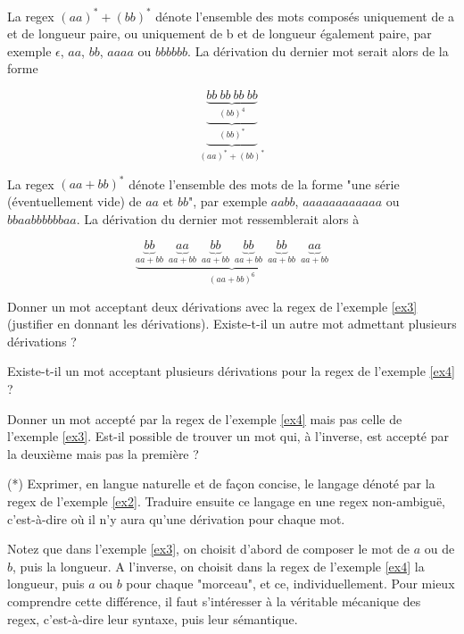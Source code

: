 \begin{example}
\label{ex3}
La regex $(aa)^*+(bb)^*$ dénote l'ensemble des mots composés uniquement de a et de longueur paire, ou uniquement de b et de longueur également paire, par exemple $\epsilon$, $aa$, $bb$, $aaaa$ ou $bbbbbb$. La dérivation du dernier mot serait alors de la forme 

\[
\underbrace{\underbrace{\underbrace{bb~bb~bb~bb}_\text{$(bb)^4$}}_\text{$(bb)^*$}}_\text{$(aa)^*+(bb)^*$}
\]
\end{example}

\begin{example}
\label{ex4}
La regex $(aa+bb)^*$ dénote l'ensemble des mots de la forme "une série  (éventuellement vide) de $aa$ et $bb$", par exemple $aabb$, $aaaaaaaaaaaa$ ou $bbaabbbbbbaa$. La dérivation du dernier mot ressemblerait alors à 

\[
\underbrace{\underbrace{bb}_\text{$aa+bb$}~~\underbrace{aa}_\text{$aa+bb$}~~\underbrace{bb}_\text{$aa+bb$}~~\underbrace{bb}_\text{$aa+bb$}~~\underbrace{bb}_\text{$aa+bb$}~~\underbrace{aa}_\text{$aa+bb$}}_\text{$(aa+bb)^6$}
\]
\end{example}

\begin{exercice}
Donner un mot acceptant deux dérivations avec la regex de l'exemple \ref{ex3} (justifier en donnant les dérivations). Existe-t-il un autre mot admettant plusieurs dérivations ?
\end{exercice}

\begin{exercice}
Existe-t-il un mot acceptant plusieurs dérivations pour la regex de l'exemple \ref{ex4} ?
\end{exercice}

\begin{exercice}
Donner un mot accepté par la regex de l'exemple \ref{ex4} mais pas celle de l'exemple \ref{ex3}. Est-il possible de trouver un mot qui, à l'inverse, est accepté par la deuxième mais pas la première ?
\end{exercice}


\begin{exercice} (*)
Exprimer, en langue naturelle et de façon concise, le langage dénoté par la regex de l'exemple \ref{ex2}. Traduire ensuite ce langage en une regex non-ambiguë, c'est-à-dire où il n'y aura qu'une dérivation pour chaque mot.
\end{exercice}


Notez que dans l'exemple \ref{ex3}, on choisit d'abord de composer le mot de $a$ ou de $b$, puis la longueur. A l'inverse, on choisit dans la regex de l'exemple \ref{ex4} la longueur, puis $a$ ou $b$ pour chaque "morceau", et ce, individuellement. Pour mieux comprendre cette différence, il faut s'intéresser à la véritable mécanique des regex, c'est-à-dire leur syntaxe, puis leur sémantique.

